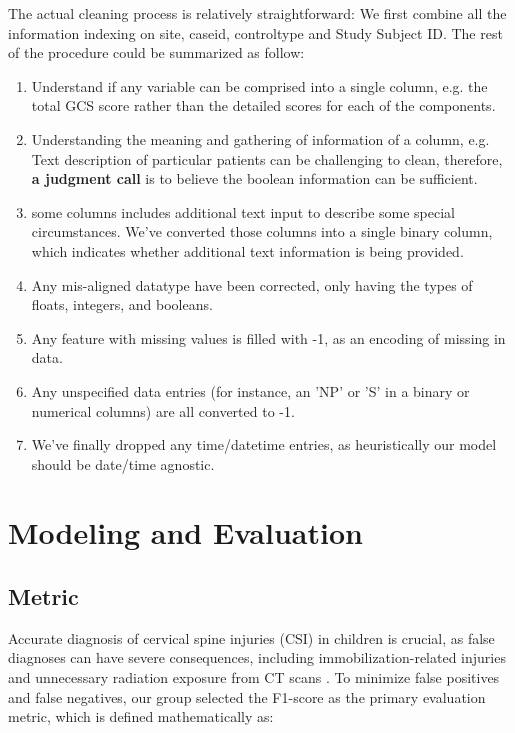 \documentclass[10pt,letterpaper]{article}
\begin{document}
The actual cleaning process is relatively straightforward: We first combine all the information indexing on site, caseid, controltype and Study Subject ID. The rest of the procedure could be summarized as follow:

\begin{enumerate}
    \item Understand if any variable can be comprised into a single column, e.g. the total GCS score rather than the detailed scores for each of the components. 
    \item Understanding the meaning and gathering of information of a column, e.g. Text description of particular patients can be challenging to clean, therefore, \textbf{a judgment call} is to believe the boolean information can be sufficient.
    \item some columns includes additional text input to describe some special circumstances. We've converted those columns into a single binary column, which indicates whether additional text information is being provided.
    \item Any mis-aligned datatype have been corrected, only having the types of floats, integers, and booleans.
    \item Any feature with missing values is filled with -1, as an encoding of missing in data. 
    \item Any unspecified data entries (for instance, an 'NP' or 'S' in a binary or numerical columns) are all converted to -1. 
    \item We've finally dropped any time/datetime entries, as heuristically our model should be date/time agnostic.
\end{enumerate}

\section{Modeling and Evaluation}

\subsection{Metric}

Accurate diagnosis of cervical spine injuries (CSI) in children is crucial, as false diagnoses can have severe consequences, including immobilization-related injuries and unnecessary radiation exposure from CT scans \cite{brown2001cervical}. To minimize false positives and false negatives, our group selected the F1-score as the primary evaluation metric, which is defined mathematically as:
\end{document}
